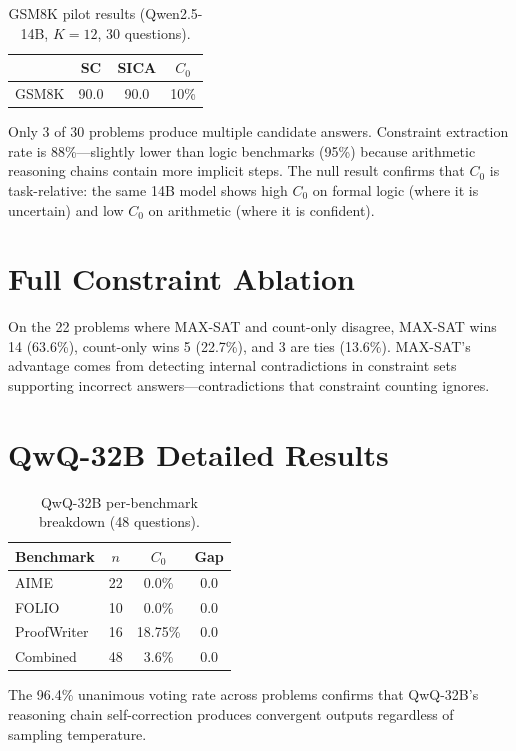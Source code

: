 \documentclass[11pt,a4paper]{article}
\begin{document}
\begin{table}[h]
\centering
\small
\caption{GSM8K pilot results (Qwen2.5-14B, $K=12$, 30 questions).}
\label{tab:gsm8k}
\begin{tabular}{lccc}
\toprule
& SC & SICA & $C_0$ \\
\midrule
GSM8K & 90.0 & 90.0 & 10\% \\
\bottomrule
\end{tabular}
\end{table}

Only 3 of 30 problems produce multiple candidate answers. Constraint extraction rate is 88\%---slightly lower than logic benchmarks (95\%) because arithmetic reasoning chains contain more implicit steps. The null result confirms that $C_0$ is task-relative: the same 14B model shows high $C_0$ on formal logic (where it is uncertain) and low $C_0$ on arithmetic (where it is confident).

\section{Full Constraint Ablation}
\label{app:ablation}

On the 22 problems where MAX-SAT and count-only disagree, MAX-SAT wins 14 (63.6\%), count-only wins 5 (22.7\%), and 3 are ties (13.6\%). MAX-SAT's advantage comes from detecting internal contradictions in constraint sets supporting incorrect answers---contradictions that constraint counting ignores.

\section{QwQ-32B Detailed Results}
\label{app:qwq}

\begin{table}[h]
\centering
\small
\caption{QwQ-32B per-benchmark breakdown (48 questions).}
\label{tab:qwq}
\begin{tabular}{lccc}
\toprule
\textbf{Benchmark} & $n$ & $C_0$ & Gap \\
\midrule
AIME & 22 & 0.0\% & 0.0 \\
FOLIO & 10 & 0.0\% & 0.0 \\
ProofWriter & 16 & 18.75\% & 0.0 \\
\midrule
Combined & 48 & 3.6\% & 0.0 \\
\bottomrule
\end{tabular}
\end{table}

The 96.4\% unanimous voting rate across problems confirms that QwQ-32B's reasoning chain self-correction produces convergent outputs regardless of sampling temperature.
\end{document}
